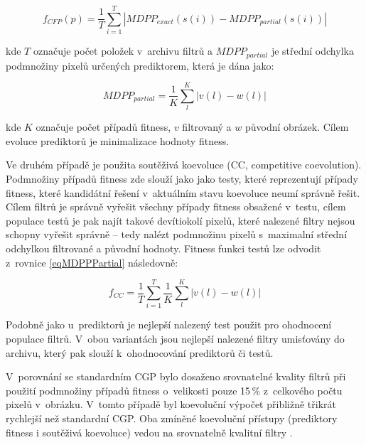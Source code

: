 \begin{equation}
    \label{eqFpredictorIF}
    f_{\mathit{CFP}} \left( p \right) = \frac{1}{T} \sum\limits_{i=1}^{T} \left| \mathit{MDPP_{exact}} \left( s \left( i \right) \right) - \mathit{MDPP_{partial}} \left( s \left( i \right) \right) \right|
\end{equation}

\noindent{}kde $T$ označuje počet položek v~archivu filtrů a $\mathit{MDPP_{partial}}$ je střední odchylka podmnožiny pixelů určených prediktorem, která je dána jako:

\begin{equation}
    \label{eqMDPPPartial}
    \mathit{MDPP_{partial}} = \frac{1}{K} \sum\limits_l^K \left| v\left( l \right) - w\left( l \right) \right|
\end{equation}

\noindent{}kde $K$ označuje počet případů fitness, $v$ filtrovaný a $w$ původní obrázek. Cílem evoluce prediktorů je minimalizace hodnoty fitness.

Ve druhém případě je použita soutěživá koevoluce (CC, competitive coevolution). Podmnožiny případů fitness zde slouží jako jako testy, které reprezentují případy fitness, které kandidátní řešení v~aktuálním stavu koevoluce neumí správně řešit. Cílem filtrů je správně vyřešit všechny případy fitness obsažené v~testu, cílem populace testů je pak najít takové devítiokolí pixelů, které nalezené filtry nejsou schopny vyřešit správně -- tedy nalézt podmnožinu pixelů s~maximalní střední odchylkou filtrované a původní hodnoty. Fitness funkci testů lze odvodit z~rovnice \ref{eqMDPPPartial} následovně:

\begin{equation}
    \label{eqFtestsIF}
    f_{\mathit{CC}} = \frac{1}{T} \sum\limits_{i=1}^{T} \frac{1}{K} \sum\limits_l^K \left| v\left( l \right) - w\left( l \right) \right|
\end{equation}

Podobně jako u~prediktorů je nejlepší nalezený test použit pro ohodnocení populace filtrů. V~obou variantách jsou nejlepší nalezené filtry umisťovány do archivu, který pak slouží k~ohodnocování prediktorů či testů.

V~porovnání se standardním CGP bylo dosaženo srovnatelné kvality filtrů při použití podmnožiny případů fitness o~velikosti pouze 15\,\% z~celkového počtu pixelů v~obrázku. V~tomto případě byl koevoluční výpočet přibližně třikrát rychlejší než standardní CGP. Oba zmíněné koevoluční přístupy (prediktory fitness i soutěživá koevoluce) vedou na srovnatelně kvalitní filtry \cite{SikuPPSN}.

